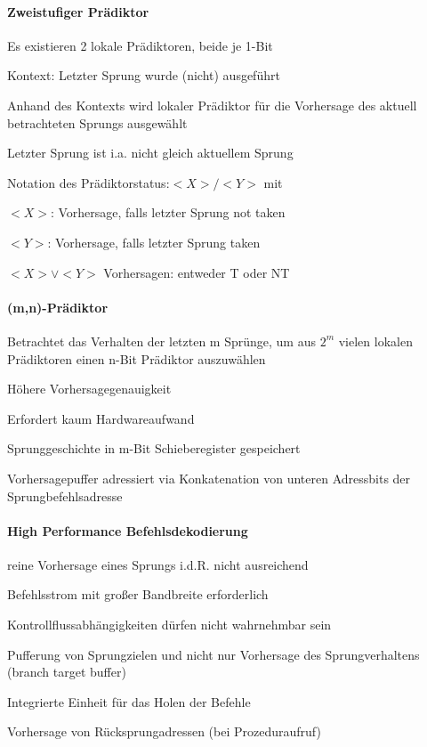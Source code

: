 \documentclass[10pt,landscape]{article}
\begin{document}
\begin{multicols}{3}
  \paragraph{Zweistufiger Prädiktor}
  \begin{itemize*}
    \item Es existieren 2 lokale Prädiktoren, beide je 1-Bit
    \item Kontext: Letzter Sprung wurde (nicht) ausgeführt
    \item Anhand des Kontexts wird lokaler Prädiktor für die Vorhersage des aktuell betrachteten Sprungs ausgewählt
    \item Letzter Sprung ist i.a. nicht gleich aktuellem Sprung
    \item Notation des Prädiktorstatus:$<X>/<Y>$ mit
    \item $<X>$: Vorhersage, falls letzter Sprung not taken
    \item $<Y>$: Vorhersage, falls letzter Sprung taken
    \item $<X>\vee<Y>$ Vorhersagen: entweder T oder NT
  \end{itemize*}
  
  \paragraph{(m,n)-Prädiktor}
  \begin{itemize*}
    \item Betrachtet das Verhalten der letzten m Sprünge, um aus $2^m$ vielen lokalen Prädiktoren einen n-Bit Prädiktor auszuwählen
    \item Höhere Vorhersagegenauigkeit
    \item Erfordert kaum Hardwareaufwand
    \item Sprunggeschichte in m-Bit Schieberegister gespeichert
    \item Vorhersagepuffer adressiert via Konkatenation von unteren Adressbits der Sprungbefehlsadresse
  \end{itemize*}
  
  \paragraph{High Performance Befehlsdekodierung}
  
  reine Vorhersage eines Sprungs i.d.R. nicht ausreichend
  \begin{itemize*}
    \item Befehlsstrom mit großer Bandbreite erforderlich
    \item Kontrollflussabhängigkeiten dürfen nicht wahrnehmbar sein 
    \item Pufferung von Sprungzielen und nicht nur Vorhersage des Sprungverhaltens (branch target buffer)
    \item Integrierte Einheit für das Holen der Befehle
    \item Vorhersage von Rücksprungadressen (bei Prozeduraufruf)
  \end{itemize*}
  

\end{multicols}
\end{document}
